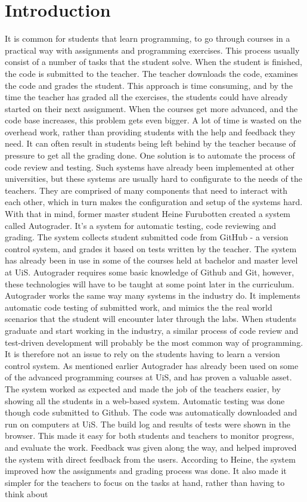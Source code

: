 \chapter*{Introduction}
It is common for students that learn programming, to go through courses in a practical way with assignments and programming exercises. This process usually consist of a number of tasks that the student solve. When the student is finished, the code is submitted to the teacher. The teacher downloads the code, examines the code and grades the student. This approach is time consuming, and by the time the teacher has graded all the exercises, the students could have already started on their next assignment. When the courses get more advanced, and the code base increases, this problem gets even bigger. A lot of time is wasted on the overhead work, rather than providing students with the help and feedback they need. It can often result in students being left behind by the teacher because of pressure to get all the grading done. One solution is to automate the process of code review and testing. Such systems have already been implemented at other universities, but these systems are usually hard to configurate to the needs of the teachers. They are comprised of many components that need to interact with each other, which in turn makes the configuration and setup of the systems hard. With that in mind, former master student Heine Furubotten created a system called Autograder. It's a system for automatic testing, code reviewing and grading. The system collects student submitted code from GitHub - a version control system, and grades it based on tests written by the teacher. The system has already been in use in some of the courses held at bachelor and master level at UiS. Autograder requires some basic knowledge of Github and Git, however, these technologies will have to be taught at some point later in the curriculum. \\Autograder works the same way many systems in the industry do. It implements automatic code testing of submitted work, and mimics the the real world scenarios that the student will encounter later through the labs. When students graduate and start working in the industry, a similar process of code review and test-driven development will probably be the most common way of programming. It is therefore not an issue to rely on the students having to learn a version control system. As mentioned earlier Autograder has already been used on some of the advanced programming courses at UiS, and has proven a valuable asset. The system worked as expected and made the job of the teachers easier, by showing all the students in a web-based system. Automatic testing was done though code submitted to Github. The code was automatically downloaded and run on computers at UiS. The build log and results of tests were shown in the  browser. This made it easy for both students and teachers to monitor progress, and evaluate the work. Feedback was given along the way, and helped improved the system with direct feedback from the users. According to Heine, the system improved how the assignments and grading process was done. It also made it simpler for the teachers to focus on the tasks at hand, rather than having to think about 